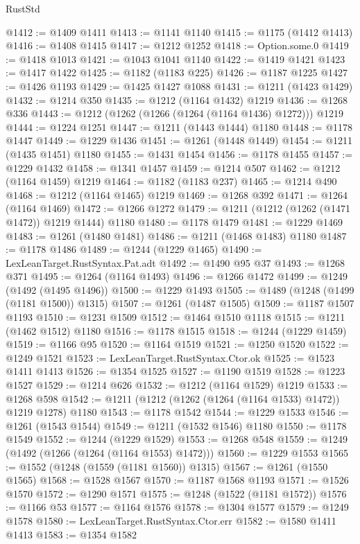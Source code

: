 \begin{lexlean}{RustStd}
\begin{coremodule}
@1412 := @1409 @1411
@1413 := @1141 @1140
@1415 := @1175 (@1412 @1413)
@1416 := @1408 @1415
@1417 := @1212 @1252
@1418 := Option.some.{0}
@1419 := @1418 @1013
@1421 := @1043 @1041 @1140
@1422 := @1419 @1421
@1423 := @1417 @1422
@1425 := @1182 (@1183 @225)
@1426 := @1187 @1225
@1427 := @1426 @1193
@1429 := @1425 @1427 @1088
@1431 := @1211 (@1423 @1429)
@1432 := @1214 @350
@1435 := @1212 (@1164 @1432) @1219
@1436 := @1268 @336
@1443 := @1212 (@1262 (@1266 (@1264 (@1164 @1436) @1272))) @1219
@1444 := @1224 @1251
@1447 := @1211 (@1443 @1444) @1180
@1448 := @1178 @1447
@1449 := @1229 @1436
@1451 := @1261 (@1448 @1449)
@1454 := @1211 (@1435 @1451) @1180
@1455 := @1431 @1454
@1456 := @1178 @1455
@1457 := @1229 @1432
@1458 := @1341 @1457
@1459 := @1214 @507
@1462 := @1212 (@1164 @1459) @1219
@1464 := @1182 (@1183 @237)
@1465 := @1214 @490
@1468 := @1212 (@1164 @1465) @1219
@1469 := @1268 @392
@1471 := @1264 (@1164 @1469)
@1472 := @1266 @1272
@1479 := @1211 (@1212 (@1262 (@1471 @1472)) @1219 @1444) @1180
@1480 := @1178 @1479
@1481 := @1229 @1469
@1483 := @1261 (@1480 @1481)
@1486 := @1211 (@1468 @1483) @1180
@1487 := @1178 @1486
@1489 := @1244 (@1229 @1465)
@1490 := LexLeanTarget.RustSyntax.Pat.adt
@1492 := @1490 @95 @37
@1493 := @1268 @371
@1495 := @1264 (@1164 @1493)
@1496 := @1266 @1472
@1499 := @1249 (@1492 (@1495 @1496))
@1500 := @1229 @1493
@1505 := @1489 (@1248 (@1499 (@1181 @1500)) @1315)
@1507 := @1261 (@1487 @1505)
@1509 := @1187 @1507 @1193
@1510 := @1231 @1509
@1512 := @1464 @1510 @1118
@1515 := @1211 (@1462 @1512) @1180
@1516 := @1178 @1515
@1518 := @1244 (@1229 @1459)
@1519 := @1166 @95
@1520 := @1164 @1519
@1521 := @1250 @1520
@1522 := @1249 @1521
@1523 := LexLeanTarget.RustSyntax.Ctor.ok
@1525 := @1523 @1411 @1413
@1526 := @1354 @1525
@1527 := @1190 @1519
@1528 := @1223 @1527
@1529 := @1214 @626
@1532 := @1212 (@1164 @1529) @1219
@1533 := @1268 @598
@1542 := @1211 (@1212 (@1262 (@1264 (@1164 @1533) @1472)) @1219 @1278) @1180
@1543 := @1178 @1542
@1544 := @1229 @1533
@1546 := @1261 (@1543 @1544)
@1549 := @1211 (@1532 @1546) @1180
@1550 := @1178 @1549
@1552 := @1244 (@1229 @1529)
@1553 := @1268 @548
@1559 := @1249 (@1492 (@1266 (@1264 (@1164 @1553) @1472)))
@1560 := @1229 @1553
@1565 := @1552 (@1248 (@1559 (@1181 @1560)) @1315)
@1567 := @1261 (@1550 @1565)
@1568 := @1528 @1567
@1570 := @1187 @1568 @1193
@1571 := @1526 @1570
@1572 := @1290 @1571
@1575 := @1248 (@1522 (@1181 @1572))
@1576 := @1166 @53
@1577 := @1164 @1576
@1578 := @1304 @1577
@1579 := @1249 @1578
@1580 := LexLeanTarget.RustSyntax.Ctor.err
@1582 := @1580 @1411 @1413
@1583 := @1354 @1582

\end{coremodule}
\end{lexlean}
